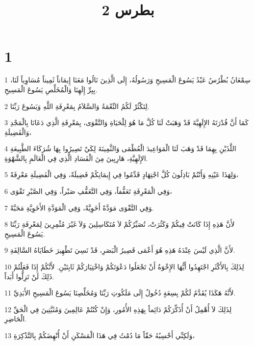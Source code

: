 

\title{2 بطرس}


\chapter{1}

\par 1 سِمْعَانُ بُطْرُسُ عَبْدُ يَسُوعَ الْمَسِيحِ وَرَسُولُهُ، إِلَى الَّذِينَ نَالُوا مَعَنَا إِيمَاناً ثَمِيناً مُسَاوِياً لَنَا، بِبِرِّ إِلَهِنَا وَالْمُخَلِّصِ يَسُوعَ الْمَسِيحِ.
\par 2 لِتَكْثُرْ لَكُمُ النِّعْمَةُ وَالسَّلاَمُ بِمَعْرِفَةِ اللَّهِ وَيَسُوعَ رَبِّنَا.
\par 3 كَمَا أَنَّ قُدْرَتَهُ الإِلَهِيَّةَ قَدْ وَهَبَتْ لَنَا كُلَّ مَا هُوَ لِلْحَيَاةِ وَالتَّقْوَى، بِمَعْرِفَةِ الَّذِي دَعَانَا بِالْمَجْدِ وَالْفَضِيلَةِ،
\par 4 اللَّذَيْنِ بِهِمَا قَدْ وَهَبَ لَنَا الْمَوَاعِيدَ الْعُظْمَى وَالثَّمِينَةَ لِكَيْ تَصِيرُوا بِهَا شُرَكَاءَ الطَّبِيعَةِ الإِلَهِيَّةِ، هَارِبِينَ مِنَ الْفَسَادِ الَّذِي فِي الْعَالَمِ بِالشَّهْوَةِ.
\par 5 وَلِهَذَا عَيْنِهِ وَأَنْتُمْ بَاذِلُونَ كُلَّ اجْتِهَادٍ قَدِّمُوا فِي إِيمَانِكُمْ فَضِيلَةً، وَفِي الْفَضِيلَةِ مَعْرِفَةً،
\par 6 وَفِي الْمَعْرِفَةِ تَعَفُّفاً، وَفِي التَّعَفُّفِ صَبْراً، وَفِي الصَّبْرِ تَقْوَى،
\par 7 وَفِي التَّقْوَى مَوَدَّةً أَخَوِيَّةً، وَفِي الْمَوَدَّةِ الأَخَوِيَّةِ مَحَبَّةً.
\par 8 لأَنَّ هَذِهِ إِذَا كَانَتْ فِيكُمْ وَكَثُرَتْ، تُصَيِّرُكُمْ لاَ مُتَكَاسِلِينَ وَلاَ غَيْرَ مُثْمِرِينَ لِمَعْرِفَةِ رَبِّنَا يَسُوعَ الْمَسِيحِ.
\par 9 لأَنَّ الَّذِي لَيْسَ عِنْدَهُ هَذِهِ هُوَ أَعْمَى قَصِيرُ الْبَصَرِ، قَدْ نَسِيَ تَطْهِيرَ خَطَايَاهُ السَّالِفَةِ.
\par 10 لِذَلِكَ بِالأَكْثَرِ اجْتَهِدُوا أَيُّهَا الإِخْوَةُ أَنْ تَجْعَلُوا دَعْوَتَكُمْ وَاخْتِيَارَكُمْ ثَابِتَيْنِ. لأَنَّكُمْ إِذَا فَعَلْتُمْ ذَلِكَ لَنْ تَزِلُّوا أَبَداً.
\par 11 لأَنَّهُ هَكَذَا يُقَدَّمُ لَكُمْ بِسِعَةٍ دُخُولٌ إِلَى مَلَكُوتِ رَبِّنَا وَمُخَلِّصِنَا يَسُوعَ الْمَسِيحِ الأَبَدِيِّ.
\par 12 لِذَلِكَ لاَ أُهْمِلُ أَنْ أُذَكِّرَكُمْ دَائِماً بِهَذِهِ الأُمُورِ، وَإِنْ كُنْتُمْ عَالِمِينَ وَمُثَبَّتِينَ فِي الْحَقِّ الْحَاضِرِ.
\par 13 وَلَكِنِّي أَحْسِبُهُ حَقّاً مَا دُمْتُ فِي هَذَا الْمَسْكَنِ أَنْ أُنْهِضَكُمْ بِالتَّذْكِرَةِ،
